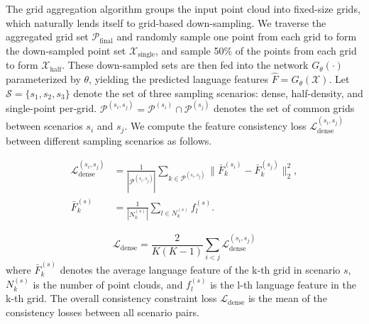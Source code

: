 \documentclass[10pt,twocolumn,letterpaper]{article}
\begin{document}
The grid aggregation algorithm groups the input point cloud into fixed-size grids, which naturally lends itself to grid-based down-sampling. We traverse the aggregated grid set $\mathcal{P}_{\text{final}}$ and randomly sample one point from each grid to form the down-sampled point set $\mathcal{X}_{\text{single}}$, and sample 50\% of the points from each grid to form $\mathcal{X}_{\text{half}}$. These down-sampled sets are then fed into the network $G_{\theta}(\cdot)$ parameterized by $\theta$, yielding the predicted language features $\hat{F} = G_{\theta}(\mathcal{X})$. Let $\mathcal{S} = \{s_1, s_2, s_3\}$ denote the set of three sampling scenarios: dense, half-density, and single-point per-grid. $\mathcal{P}^{(s_i,s_j)} = \mathcal{P}^{(s_i)} \cap \mathcal{P}^{(s_j)}$ denotes the set of common grids between scenarios $s_i$ and $s_j$. We compute the feature consistency loss $\mathcal{L}_{\text{dense}}^{(s_i,s_j)}$ between different sampling scenarios as follows.

\begin{equation}
    \begin{aligned}
    \mathcal{L}_{\text{dense}}^{(s_i,s_j)} &= \frac{1}{|\mathcal{P}^{(s_i,s_j)}|} \sum_{k \in \mathcal{P}^{(s_i,s_j)}} \|\bar{F}_k^{(s_i)} - \bar{F}_k^{(s_j)}\|_2^2, \\
    \bar{F}_k^{(s)} &= \frac{1}{|N_k^{(s)}|} \sum_{l \in N_k^{(s)}} f_l^{(s)}.
    \end{aligned}
     \label{eq:loss-dense-perscene}
\end{equation}
  
\begin{equation}
    \mathcal{L}_{\text{dense}} = \frac{2}{K(K-1)} \sum_{i < j} \mathcal{L}_{\text{dense}}^{(s_i,s_j)}
\end{equation}
where $\bar{F}_k^{(s)}$ denotes the average language feature of the k-th grid in scenario $s$, $N_k^{(s)}$ is the number of point clouds, and $f_l^{(s)}$ is the l-th language feature in the k-th grid. The overall consistency constraint loss $\mathcal{L}_{\text{dense}}$ is the mean of the consistency losses between all scenario pairs. 
\end{document}
